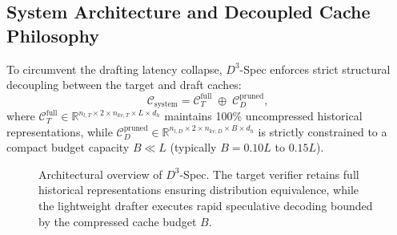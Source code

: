 \documentclass[runningheads]{llncs}
\begin{document}
\subsection{System Architecture and Decoupled Cache Philosophy}
To circumvent the drafting latency collapse, $D^3$-Spec enforces strict structural decoupling between the target and draft caches:
\begin{equation}
    \mathcal{C}_{\text{system}} = \mathcal{C}_T^{\text{full}} \;\oplus\; \mathcal{C}_D^{\text{pruned}},
\end{equation}
where $\mathcal{C}_T^{\text{full}} \in \mathbb{R}^{n_{l, T} \times 2 \times n_{kv, T} \times L \times d_h}$ maintains 100\% uncompressed historical representations, while $\mathcal{C}_D^{\text{pruned}} \in \mathbb{R}^{n_{l, D} \times 2 \times n_{kv, D} \times B \times d_h}$ is strictly constrained to a compact budget capacity $B \ll L$ (typically $B = 0.10L$ to $0.15L$).

\begin{figure}[t]
\centering
{}
\caption{Architectural overview of $D^3$-Spec. The target verifier retains full historical representations ensuring distribution equivalence, while the lightweight drafter executes rapid speculative decoding bounded by the compressed cache budget $B$.}
\label{fig:arch}
\end{figure}
\end{document}
